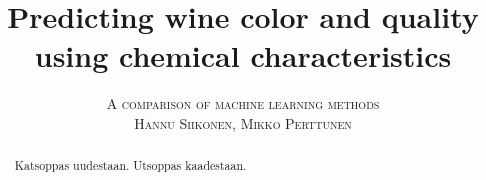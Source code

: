\documentclass[twoside]{article}
\title{\vspace{-15mm}\fontsize{24pt}{10pt}\selectfont\textbf{Predicting wine color and quality using chemical characteristics}}
\author{
\large
\textsc{A comparison of machine learning methods}\\[2mm]
\textsc{Hannu Siikonen, Mikko Perttunen}\\[2mm]
\vspace{-5mm}
}
\date{}
\begin{document}
\maketitle %


\begin{abstract}

\noindent Katsoppas uudestaan. Utsoppas kaadestaan.

\end{abstract}

\end{document}
